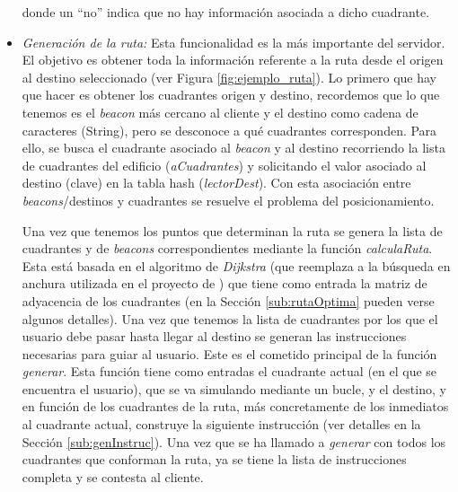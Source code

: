 \begin{itemize}
donde un ``no'' indica que no hay información asociada a dicho cuadrante. %
	
	  
	\item \textit{Generación de la ruta:} Esta funcionalidad es la más importante del servidor. El objetivo es obtener toda la información referente a la ruta desde el origen al destino seleccionado (ver Figura \ref{fig:ejemplo_ruta}). Lo primero que hay que hacer es obtener los cuadrantes origen y destino, recordemos que lo que tenemos es el \textit{beacon} más cercano al cliente y el destino como cadena de caracteres (String), pero se desconoce a qué cuadrantes corresponden. Para ello, se busca el cuadrante asociado al \textit{beacon} y al destino recorriendo la lista de cuadrantes del edificio (\textit{aCuadrantes}) y solicitando el valor asociado al destino (clave) en la tabla hash (\textit{lectorDest}). Con esta asociación entre \textit{beacons}/destinos y cuadrantes se resuelve el problema del posicionamiento. 
	
	Una vez que tenemos los puntos que determinan la ruta se genera la lista de cuadrantes y de \textit{beacons} correspondientes mediante la función \textit{calculaRuta}. Esta está basada en el algoritmo de \textit{Dijkstra} (que reemplaza a la búsqueda en anchura utilizada en el proyecto de \cite{TFGguia}) que tiene como entrada la matriz de adyacencia de los cuadrantes (en la Sección \ref{sub:rutaOptima} pueden verse algunos detalles). Una vez que tenemos la lista de cuadrantes por los que el usuario debe pasar hasta llegar al destino se generan las instrucciones necesarias para guiar al usuario. Este es el cometido principal de la función \textit{generar}. Esta función tiene como entradas el cuadrante actual (en el que se encuentra el usuario), que se va simulando mediante un bucle, y el destino, y en función de los cuadrantes de la ruta, más concretamente de los inmediatos al cuadrante actual, construye la siguiente instrucción (ver detalles en la Sección \ref{sub:genInstruc}). Una vez que se ha llamado a \textit{generar} con todos los cuadrantes que conforman la ruta, ya se tiene la lista de instrucciones completa y se contesta al cliente.
\end{itemize}


